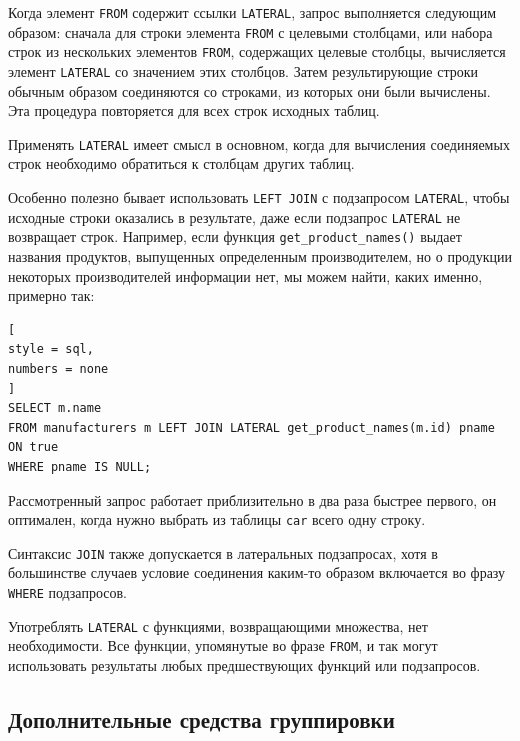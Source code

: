 \documentclass[%
	11pt,
	a4paper,
	utf8,
		]{article}
\begin{document}

Когда элемент \texttt{FROM} содержит ссылки \texttt{LATERAL}, запрос выполняется следующим образом: сначала для строки элемента \texttt{FROM} с целевыми столбцами, или набора строк из нескольких элементов \texttt{FROM}, содержащих целевые столбцы, вычисляется элемент \texttt{LATERAL} со значением этих столбцов. Затем результирующие строки обычным образом соединяются со строками, из которых они были вычислены. Эта процедура повторяется для всех строк исходных таблиц.

Применять \texttt{LATERAL} имеет смысл в основном, когда для вычисления соединяемых строк необходимо обратиться к столбцам других таблиц. 

Особенно полезно бывает использовать \texttt{LEFT JOIN} с подзапросом \texttt{LATERAL}, чтобы исходные строки оказались в результате, даже если подзапрос \texttt{LATERAL} не возвращает строк. Например, если функция \texttt{get\_product\_names()} выдает названия продуктов, выпущенных определенным производителем, но о продукции некоторых производителей информации нет, мы можем найти, каких именно, примерно так:
\begin{lstlisting}[
style = sql,
numbers = none
]
SELECT m.name
FROM manufacturers m LEFT JOIN LATERAL get_product_names(m.id) pname ON true
WHERE pname IS NULL;
\end{lstlisting}

Рассмотренный запрос работает приблизительно в два раза быстрее первого, он оптимален, когда нужно выбрать из таблицы \texttt{car} всего одну строку.

Синтаксис \texttt{JOIN} также допускается в латеральных подзапросах, хотя в большинстве случаев условие соединения каким-то образом включается во фразу \texttt{WHERE} подзапросов.

Употреблять \texttt{LATERAL} с функциями, возвращающими множества, нет необходимости. Все функции, упомянутые во фразе \texttt{FROM}, и так могут использовать результаты любых предшествующих функций или подзапросов.

\subsection{Дополнительные средства группировки}
\end{document}
